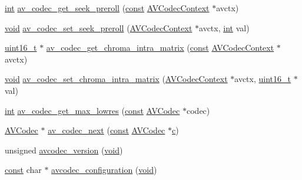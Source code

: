 \begin{DoxyCompactItemize}
\hyperlink{xmltok_8h_a5a0d4a5641ce434f1d23533f2b2e6653}{int} \hyperlink{group__lavc__core_ga1065b464eb473666a6758d4d7089385e}{av\+\_\+codec\+\_\+get\+\_\+seek\+\_\+preroll} (\hyperlink{getopt1_8c_a2c212835823e3c54a8ab6d95c652660e}{const} \hyperlink{struct_a_v_codec_context}{A\+V\+Codec\+Context} $\ast$avctx)
\item 
\hyperlink{sound_8c_ae35f5844602719cf66324f4de2a658b3}{void} \hyperlink{group__lavc__core_ga7b1bfa942a5074882680616694e93c59}{av\+\_\+codec\+\_\+set\+\_\+seek\+\_\+preroll} (\hyperlink{struct_a_v_codec_context}{A\+V\+Codec\+Context} $\ast$avctx, \hyperlink{xmltok_8h_a5a0d4a5641ce434f1d23533f2b2e6653}{int} val)
\item 
\hyperlink{lib-src_2ffmpeg_2win32_2stdint_8h_a30af71eaf40c925c9832eb289a48da35}{uint16\+\_\+t} $\ast$ \hyperlink{group__lavc__core_ga5425dce8ae0a9f8ab8ac09b131b083f6}{av\+\_\+codec\+\_\+get\+\_\+chroma\+\_\+intra\+\_\+matrix} (\hyperlink{getopt1_8c_a2c212835823e3c54a8ab6d95c652660e}{const} \hyperlink{struct_a_v_codec_context}{A\+V\+Codec\+Context} $\ast$avctx)
\item 
\hyperlink{sound_8c_ae35f5844602719cf66324f4de2a658b3}{void} \hyperlink{group__lavc__core_ga5e57eb44d2173147901d8415cb85f4d7}{av\+\_\+codec\+\_\+set\+\_\+chroma\+\_\+intra\+\_\+matrix} (\hyperlink{struct_a_v_codec_context}{A\+V\+Codec\+Context} $\ast$avctx, \hyperlink{lib-src_2ffmpeg_2win32_2stdint_8h_a30af71eaf40c925c9832eb289a48da35}{uint16\+\_\+t} $\ast$val)
\item 
\hyperlink{xmltok_8h_a5a0d4a5641ce434f1d23533f2b2e6653}{int} \hyperlink{group__lavc__core_gafda0a87bc29a129cd12e858b4609cccd}{av\+\_\+codec\+\_\+get\+\_\+max\+\_\+lowres} (\hyperlink{getopt1_8c_a2c212835823e3c54a8ab6d95c652660e}{const} \hyperlink{struct_a_v_codec}{A\+V\+Codec} $\ast$codec)
\item 
\hyperlink{struct_a_v_codec}{A\+V\+Codec} $\ast$ \hyperlink{group__lavc__core_ga15369ce1a486dd26a14a043c2b4d7e76}{av\+\_\+codec\+\_\+next} (\hyperlink{getopt1_8c_a2c212835823e3c54a8ab6d95c652660e}{const} \hyperlink{struct_a_v_codec}{A\+V\+Codec} $\ast$\hyperlink{rfft2d_test_m_l_8m_ae0323a9039add2978bf5b49550572c7c}{c})
\item 
unsigned \hyperlink{group__lavc__core_gadf72cccead0dc2575adcea2dc3e1ae7c}{avcodec\+\_\+version} (\hyperlink{sound_8c_ae35f5844602719cf66324f4de2a658b3}{void})
\item 
\hyperlink{getopt1_8c_a2c212835823e3c54a8ab6d95c652660e}{const} char $\ast$ \hyperlink{group__lavc__core_gaba6aaa26147862a94d660a7b21ecd156}{avcodec\+\_\+configuration} (\hyperlink{sound_8c_ae35f5844602719cf66324f4de2a658b3}{void})

\end{DoxyCompactItemize}
